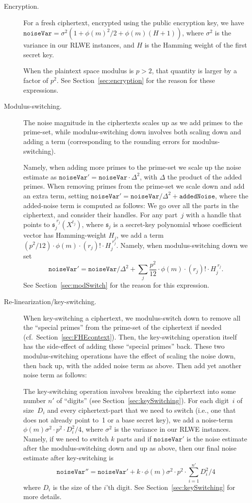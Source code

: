 \documentclass[14pt]{extarticle}
\newcommand{\secref}[1]{Section~\protect\ref{sec:#1}}
\newcommand{\sk}{\mathfrak{s}}
\begin{document}
\begin{description}
\item[Encryption.] For a fresh ciphertext, encrypted using the public
encryption key, we have $\mathtt{noiseVar}=\sigma^2(1+ \phi(m)^2/2 + 
\phi(m)(H+1))$, where $\sigma^2$ is the variance in our RLWE
instances, and $H$ is the Hamming weight of the first secret key.

When the plaintext space modulus is $p>2$, that quantity is larger by
a factor of $p^2$. See \secref{encryption} for the
reason for these expressions.

\item[Modulus-switching.] The noise magnitude in the ciphertexts
scales up as we add primes to the prime-set, while modulus-switching
down involves both scaling down and adding a term (corresponding
to the rounding errors for modulus-switching). 

Namely, when adding
more primes to the prime-set we scale up the noise estimate as
$\mathtt{noiseVar}'=\mathtt{noiseVar}\cdot\Delta^2$, with $\Delta$
the product of the added primes.
When removing primes from the prime-set we scale down and add an
extra term, setting $\mathtt{noiseVar}'=\mathtt{noiseVar}/\Delta^2
+\mathtt{addedNoise}$, where the added-noise term is computed as
follows: We go over all the parts in the ciphertext, and consider
their handles. For any part~$j$ with a handle that points to
$\sk_{j}^{\;r_j}(X^{t_j})$, where $\sk_{j}$ is a secret-key polynomial
whose coefficient vector has Hamming-weight $H_j$, we add a term
$(p^2/12)\cdot\phi(m) \cdot(r_j)!\cdot H_j^{\;r_j}$. Namely, when
modulus-switching down we set
\[
\mathtt{noiseVar}' = \mathtt{noiseVar}/\Delta^2 +
\sum_j \frac{p^2}{12}\cdot\phi(m) \cdot(r_j)! \cdot  H_j^{\;r_j}.
\]
See \secref{modSwitch} for the reason for this expression.

\item[Re-linearization/key-switching.]
When key-switching a ciphertext, we modulus-switch down to remove
all the ``special primes'' from the prime-set of the ciphertext if
needed (cf.~\secref{FHEcontext}). Then, the key-switching operation
itself has the side-effect of adding these ``special primes'' back.
These two modulus-switching operations have the effect of scaling the
noise down, then back up, with the added noise term as above.
Then add yet another noise term as follows:

The key-switching operation involves breaking the ciphertext into some
number $n'$ of ``digits'' (see \secref{keySwitching}).
For each digit~$i$ of size~$D_i$ and every ciphertext-part that we need
to switch (i.e., one that does not already point to~1 or a base secret
key), we add a noise-term $\phi(m)\sigma^2\cdot p^2\cdot D_i^2/4$,
where $\sigma^2$ is the variance in our RLWE instances. Namely, if
we need to switch $k$ parts and if $\mathtt{noiseVar}'$ is the noise
estimate after the modulus-switching down and up as above, then our
final noise estimate after key-switching is
\[
\mathtt{noiseVar}'' = \mathtt{noiseVar}' + k\cdot\phi(m)\sigma^2
\cdot p^2\cdot \sum_{i=1}^{n'} D_i^2/4
\]
where $D_i$ is the size of the $i$'th digit. See \secref{keySwitching}
for more details.


\end{description}
\end{document}
